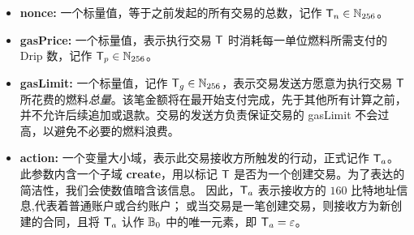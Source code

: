 \begin{itemize} [nosep]
	\item {\bf nonce:} 一个标量值，等于之前发起的所有交易的总数，记作 $\textsf{T}_n \in\mathbb{N}_{256}$。

	\item {\bf gasPrice:} 一个标量值，表示执行交易 $\textsf{T}$ 时消耗每一单位燃料所需支付的 Drip 数，记作 $\textsf{T}_p\in\mathbb{N}_{256}$。

	\item {\bf gasLimit:} 
	一个标量值，记作 $\textsf{T}_g\in\mathbb{N}_{256}$，表示交易发送方愿意为执行交易 $\textsf{T}$ 所花费的燃料\emph{总量}。该笔金额将在最开始支付完成，先于其他所有计算之前，并不允许后续追加或退款。交易的发送方负责保证交易的 gasLimit 不会过高，以避免不必要的燃料浪费。

	\item {\bf action:} 
	一个变量大小域，表示此交易接收方所触发的行动，正式记作 $\textsf{T}_a$。
	此参数内含一个子域 {\bf create}，用以标记 $\textsf{T}$ 是否为一个创建交易。为了表达的简洁性，我们会使数值暗含该信息。
	因此，$\textsf{T}_a$ 表示接收方的 $160$ 比特地址信息,代表着普通账户或合约账户； 
	或当交易是一笔创建交易，则接收方为新创建的合同，且将 $\textsf{T}_a$ 认作 $\mathbb{B}_0$ 中的唯一元素，即 $\textsf{T}_a = \mathbb{\varepsilon}$。


\end{itemize}
